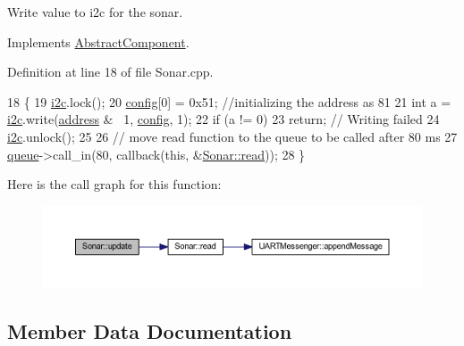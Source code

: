 Write value to i2c for the sonar. 



Implements \hyperlink{class_abstract_component_af25a90b8ab213762221c3b358d9873f3}{Abstract\+Component}.



Definition at line 18 of file Sonar.\+cpp.


\begin{DoxyCode}
18                    \{
19     \hyperlink{class_sonar_ae6be174d7fc69e27ae5d932b26a5a003}{i2c}.lock();
20     \hyperlink{class_sonar_a6a5dc5e466fc0c7a8cb2fc50af10db45}{config}[0] = 0x51; \textcolor{comment}{//initializing the address as 81}
21     \textcolor{keywordtype}{int} a = \hyperlink{class_sonar_ae6be174d7fc69e27ae5d932b26a5a003}{i2c}.write(\hyperlink{class_sonar_aa42fef5da4ff8d80353143a74eff2ae2}{address} & ~1, \hyperlink{class_sonar_a6a5dc5e466fc0c7a8cb2fc50af10db45}{config}, 1);
22     \textcolor{keywordflow}{if} (a != 0)
23         \textcolor{keywordflow}{return}; \textcolor{comment}{// Writing failed}
24     \hyperlink{class_sonar_ae6be174d7fc69e27ae5d932b26a5a003}{i2c}.unlock();
25 
26     \textcolor{comment}{// move read function to the queue to be called after 80 ms}
27     \hyperlink{class_sonar_af0431d160853c8313eba0fd0e1ce8346}{queue}->call\_in(80, callback(\textcolor{keyword}{this}, &\hyperlink{class_sonar_af7a8bb36d925d164b31ff271f9006dc7}{Sonar::read}));
28 \}
\end{DoxyCode}
Here is the call graph for this function\+:\nopagebreak
\begin{figure}[H]
\begin{center}
\leavevmode
\includegraphics[width=350pt]{class_sonar_aaf10dd734528b86b4dea3ab35c4ee4f4_cgraph}
\end{center}
\end{figure}


\subsection{Member Data Documentation}
\mbox{\label{class_sonar_aa42fef5da4ff8d80353143a74eff2ae2}} 
